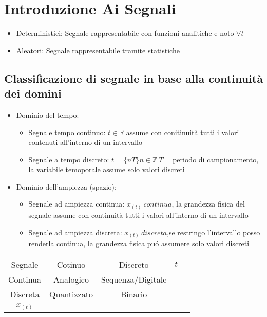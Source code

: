 \section{Introduzione Ai Segnali}
    \begin{itemize}
        \item {
            Deterministici: Segnale rappresentabile con funzioni analitiche e noto $\forall t$
        }
        \item {
            Aleatori: Segnale rappresentabile tramite statistiche 
        }
    \end{itemize}
    \subsection{Classificazione di segnale in base alla continuità dei domini}
        \begin{itemize}
            \item {Dominio del tempo:
                    \begin{itemize}
                        \item{Segnale tempo continuo: $t \in \mathbb{R}$ assume con conitinuità tutti i valori contenuti all'interno di un intervallo}
                        \item {Segnale a tempo discreto: $t = \{ nT \} n \in \mathbb{Z} \ T=$periodo di campionamento, la variabile temoporale assume solo valori discreti}
                    \end{itemize}
            }
            \item {Dominio dell'ampiezza (spazio):
                    \begin{itemize}
                        \item{Segnale ad ampiezza continua: $x_{(t)}\ continua$, la grandezza fisica del segnale assume con continuità tutti i valori all'interno di un intervallo}
                        \item {Segnale ad ampiezza discreta: $x_{(t)}\ discreta$,se restringo l'intervallo posso renderla continua, la grandezza fisica puó assumere solo valori discreti}
                    \end{itemize}
            }
        \end{itemize}
        \begin{table}[h]
            \centering
            \begin{tabular}{c|cccc}
            Segnale   & \multicolumn{1}{c|}{Cotinuo}     & Discreto          & $t$ &  \\ \cline{1-4}
            Continua  & \multicolumn{1}{c|}{Analogico}   & Sequenza/Digitale &       &  \\ \cline{1-3}
            Discreta  & \multicolumn{1}{c|}{Quantizzato} & Binario           &       &  \\
            $x_{(t)}$ &                                  &                   &       & 
            \end{tabular}
        \end{table}
